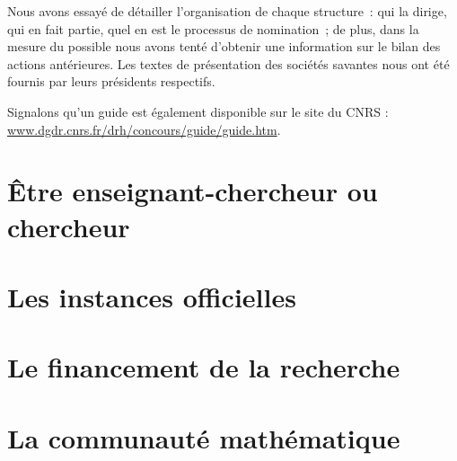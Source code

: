 \documentclass[11pt]{book}
\begin{document}
Nous avons essay\'e de d\'etailler l'organisation de chaque structure~:
qui la dirige, qui en fait partie, quel en est le processus de
nomination~; de plus, dans la mesure du possible nous avons tent\'e
d'obtenir une information sur le bilan des actions ant\'erieures.
Les textes de pr\'e\-sen\-ta\-tion des
soci\'et\'es savantes nous ont \'et\'e
fournis par leurs pr\'esidents respectifs.

Signalons qu'un guide est \'egalement disponible sur le site du CNRS :
\url{www.dgdr.cnrs.fr/drh/concours/guide/guide.htm}.



\part{\^Etre enseignant-chercheur ou chercheur}








\part{Les instances officielles}


 







\part{Le financement de la recherche}





\part{La communaut\'e math\'ematique}








\printindex
\end{document}
